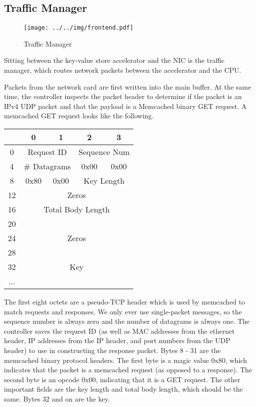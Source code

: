 \subsection{Traffic Manager}
\begin{figure}
    \begin{center}
\texttt{[image: ../../img/frontend.pdf]}
        \caption{Traffic Manager}
        \label{fig:frontend}
    \end{center}
\end{figure}

Sitting between the key-value store accelerator and the NIC is the traffic
manager, which routes network packets between the accelerator and the CPU.

Packets from the network card are first written into the main buffer.
At the same time, the controller inspects the packet header to determine if
the packet is an IPv4 UDP packet and that the payload is a Memcached binary
GET request. A memcached GET request looks like the following.

\begin{center}
    \begin{tabular}{|c|c|c|c|c|}
        \hline
          & 0 & 1 & 2 & 3 \\
        \hline
        0 & \multicolumn{2}{|c}{Request ID} & \multicolumn{2}{|c|}{Sequence Num} \\
        \hline
        4 & \multicolumn{2}{|c|}{\# Datagrams} & 0x00 & 0x00 \\
        \hline
        8 & 0x80 & 0x00 & \multicolumn{2}{c|}{Key Length} \\
        \hline
        12 & \multicolumn{4}{|c|}{Zeros} \\
        \hline
        16 & \multicolumn{4}{|c|}{Total Body Length} \\
        \hline
        20 & \multicolumn{4}{|c|}{\multirow{3}{*}{Zeros}} \\
        \cline{1-1}
        24 & \multicolumn{4}{|c|}{} \\
        \cline{1-1}
        28 & \multicolumn{4}{|c|}{} \\
        \hline
        32 & \multicolumn{4}{|c|}{Key} \\
        ... & \multicolumn{4}{|c|}{} \\
        \hline
    \end{tabular}
\end{center}

The first eight octets are a pseudo-TCP header which is used by memcached to
match requests and responses. We only ever use single-packet messages,
so the sequence number is always zero and the number of datagrams is 
always one. The controller saves the request ID (as well as MAC addresses
from the ethernet header, IP addresses from the IP header, and port numbers
from the UDP header) to use in constructing the response packet.
Bytes 8 - 31 are the memcached binary protocol headers. The first byte is a
magic value 0x80, which indicates that the packet is a memcached request
(as opposed to a response). The second byte is an opcode 0x00, indicating that
it is a GET request. The other important fields are the key length and total
body length, which should be the same. Bytes 32 and on are the key.

